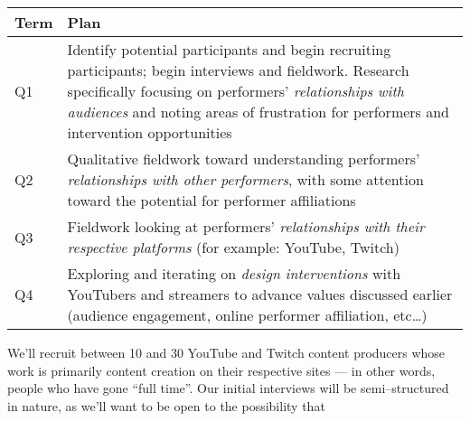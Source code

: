 \documentclass[10pt]{article}
\newcommand{\topic}[1]{{\color{Blue}#1}}
\begin{document}
\begin{tabular}{p{2cm}|p{13cm}}
  \textbf{Term} & \textbf{Plan} \\
\hline
Q1  & Identify potential participants and begin recruiting participants;
      begin interviews and fieldwork.
      Research specifically focusing on performers' \textit{relationships with audiences}
      and noting areas of frustration for performers and intervention opportunities \\
\hline
Q2  & Qualitative fieldwork toward understanding performers' \textit{relationships with other performers},
      with some attention toward the potential for performer affiliations \\
\hline
Q3  & Fieldwork looking at performers' \textit{relationships with their respective platforms}
      (for example: YouTube, Twitch) \\
\hline
Q4  & Exploring and iterating on \textit{design interventions} with YouTubers and streamers
      to advance values discussed earlier
      (audience engagement, online performer affiliation, etc\dots)  \\
\end{tabular}

\topic{We'll recruit between 10 and 30 YouTube and Twitch content producers whose work is primarily content creation on their respective sites
--- in other words, people who have gone ``full time''.}
Our initial interviews will be semi--structured in nature, as we'll want to be open to the possibility that 
\end{document}
